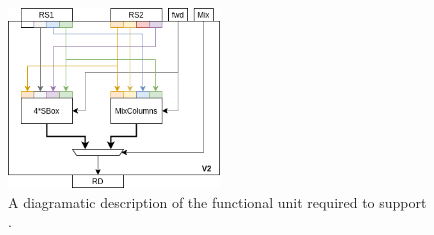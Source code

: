 
\newpage

\vspace*{\fill}

\begin{figure}[!h]
\centering
\includegraphics[width={0.5\textwidth}]{diagrams/ise-datapath-v2.png}
\caption{
  A diagramatic description of the functional unit required to support .
}
\label{fig:v2:fu}
\end{figure}

\vspace*{\fill}

